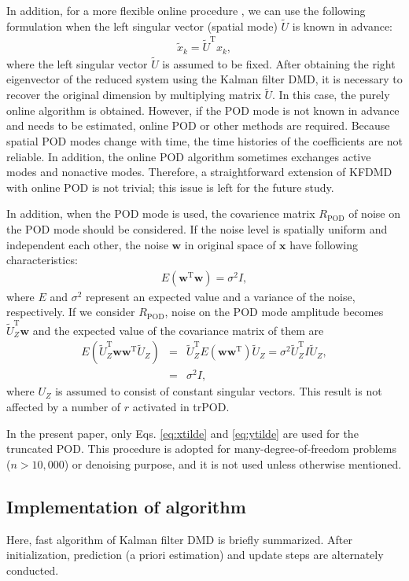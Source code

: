 \documentclass[aip,graphicx]{revtex4-1}
\begin{document}
In addition, for a more flexible online procedure , we can use the following formulation when the left singular vector (spatial mode) $\tilde U$ is known in advance: 
\begin{eqnarray}
\tilde x_k=\tilde U^\text{T} x_k,
\end{eqnarray}
where the left singular vector $\tilde U$ is assumed to be fixed. After obtaining the right eigenvector of the reduced system using the Kalman filter DMD, it is necessary to recover the original dimension by multiplying matrix $\tilde U$. In this case, the purely online algorithm is obtained. However, if the POD mode is not known in advance and needs to be estimated, online POD or other methods are required. Because spatial POD modes change with time, the time histories of the coefficients are not reliable. In addition, the online POD algorithm sometimes exchanges active modes and nonactive modes. Therefore, a straightforward extension of KFDMD with online POD is not trivial; this issue is left for the future study.


In addition, when the POD mode is used, the covarience matrix $R_\text{POD}$ of noise on the POD mode should be considered. If the noise level is spatially uniform and independent each other, the noise $\bm{w}$ in original space of $\bm{x}$ have following characteristics:
\begin{eqnarray}
E(\bm{w}^\text{T} \bm{w})=\sigma^2 I,
\end{eqnarray}
where $E$ and $\sigma^2$ represent an expected value and a variance of the noise, respectively. If we consider $R_\text{POD}$, noise on the POD mode amplitude becomes $\tilde{U}^\text{T}_Z\bm{w}$ and the expected value of the covariance matrix of them are 
\begin{eqnarray}
E(\tilde{U}_Z^\text{T}\bm{w} \bm{w}^\text{T} \tilde{U}_Z)&=&\tilde{U}_Z^\text{T} E(\bm{w}\bm{w}^\text{T})\tilde{U}_Z=\sigma^2 \tilde{U}_Z^\text{T} I \tilde{U}_Z,\\
&=&\sigma^2 I,
\end{eqnarray}
where $U_Z$ is assumed to consist of constant singular vectors. This result is not affected by a number of $r$ activated in trPOD. 

In the present paper, only Eqs. \ref{eq:xtilde} and \ref{eq:ytilde} are used for the truncated POD.   This procedure is adopted for many-degree-of-freedom problems ($n>10,000$) or denoising purpose, and it is not used unless otherwise mentioned. 

\subsection{Implementation of algorithm}
\label{sec:Imple}
Here, fast algorithm of Kalman filter DMD is briefly summarized. After initialization, prediction (a priori estimation) and update steps are alternately conducted. 
\end{document}

